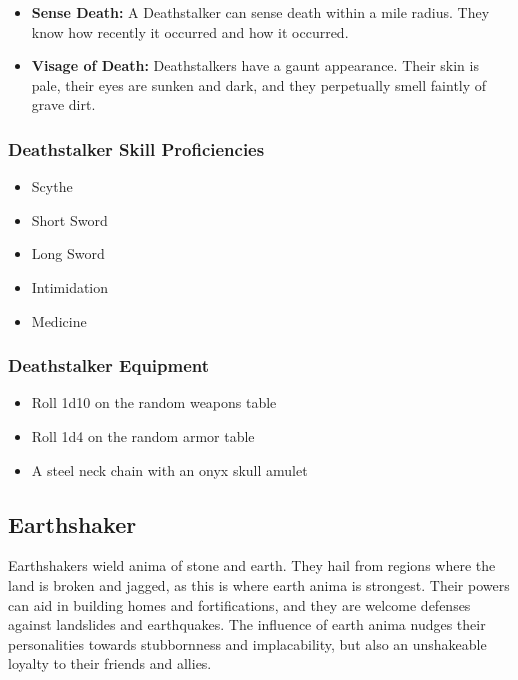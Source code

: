 \begin{multicols}{2}
\begin{itemize}
  \item \textbf{Sense Death:} A Deathstalker can sense death within a
    mile radius. They know how recently it occurred and how it occurred.
  \item \textbf{Visage of Death:} Deathstalkers have a gaunt appearance.
    Their skin is pale, their eyes are sunken and dark, and they perpetually
    smell faintly of grave dirt.
\end{itemize}

\subsubsection{Deathstalker Skill Proficiencies}

\begin{itemize}
  \item Scythe
  \item Short Sword
  \item Long Sword
  \item Intimidation
  \item Medicine
\end{itemize}

\subsubsection{Deathstalker Equipment}

\begin{itemize}
  \item Roll 1d10 on the random weapons table
  \item Roll 1d4 on the random armor table
  \item A steel neck chain with an onyx skull amulet
\end{itemize}

\subsection{Earthshaker}

Earthshakers wield anima of stone and earth. They hail from regions where
the land is broken and jagged, as this is where earth anima is strongest.
Their powers can aid in building homes and fortifications, and they are
welcome defenses against landslides and earthquakes. The influence of earth
anima nudges their personalities towards stubbornness and implacability, but
also an unshakeable loyalty to their friends and allies.


\end{multicols}
